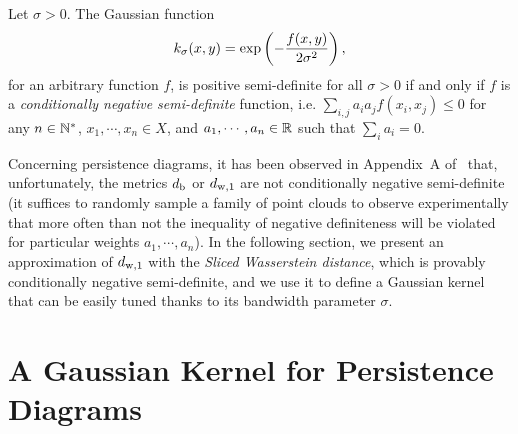 \begin{thm}\label{th:berg}
Let $\sigma >0$. The Gaussian function $$k_\sigma(x,y)= {\rm exp}\left(-\frac{f(x,y)}{2\sigma^2}\right),$$
for an arbitrary function $f$, is positive semi-definite for all $\sigma>0$ 
if and only if $f$ is a \emph{conditionally negative semi-definite} function, i.e. $\sum_{i,j}a_ia_jf(x_i,x_j)\leq 0$
for any $n \in\mathbb{N}^*$, $x_1,\cdots,x_n \in X$, and $ a_1,\cdots,a_n \in \mathbb{R}$ such that $\sum_ia_i=0$.
\end{thm}

Concerning persistence diagrams, it has been observed in Appendix~A of~\cite{Reininghaus14} that, 
unfortunately, the metrics $d_{\rm b}$ or $d_{{\rm w},1}$ %
are not conditionally negative semi-definite 
(it suffices to randomly sample a family of point 
clouds to observe experimentally that more often than not the inequality of negative definiteness will be violated for particular weights $a_1,\cdots,a_n$). 
In the following section, we present an approximation of $d_{{\rm w},1}$ with the {\em Sliced Wasserstein distance}, which is provably 
conditionally negative semi-definite, and we use it to define a Gaussian kernel that can be easily tuned thanks to its bandwidth parameter $\sigma$.
























\section{A Gaussian Kernel for Persistence Diagrams}
\label{sec:GaussianPDs}


